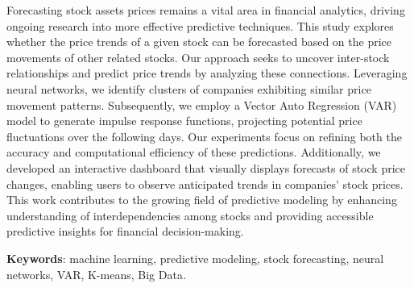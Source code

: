 Forecasting stock assets prices remains a vital area in financial
analytics, driving ongoing research into more effective predictive
techniques. This study explores whether the price trends of a given
stock can be forecasted based on the price movements of other related
stocks. Our approach seeks to uncover inter-stock relationships and
predict price trends by analyzing these connections. Leveraging neural
networks, we identify clusters of companies exhibiting similar price
movement patterns. Subsequently, we employ a Vector Auto Regression
(VAR) model to generate impulse response functions, projecting potential
price fluctuations over the following days. Our experiments focus on
refining both the accuracy and computational efficiency of these
predictions. Additionally, we developed an interactive dashboard that
visually displays forecasts of stock price changes, enabling users to
observe anticipated trends in companies' stock prices. This work
contributes to the growing field of predictive modeling by enhancing
understanding of interdependencies among stocks and providing accessible
predictive insights for financial decision-making.

{\bfseries Keywords}: machine learning, predictive modeling, stock
forecasting, neural networks, VAR, K-means, Big Data\emph{.}

